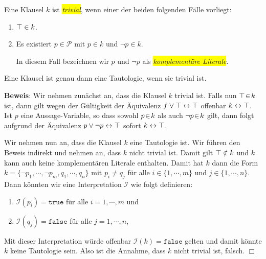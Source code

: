 \begin{Definition}
  Eine Klausel $k$ ist \colorbox{yellow}{\emph{trivial}}, wenn einer der beiden folgenden F\"{a}lle vorliegt:
  \begin{enumerate}
  \item $\top \in k$.
  \item Es existiert $p \in \mathcal{P}$ mit $p \in k$ und $\neg p \in k$.

        In diesem Fall bezeichnen wir $p$ und $\neg p$ als \colorbox{yellow}{\emph{komplement\"{a}re Literale}}.
        \eox
\end{enumerate}
\end{Definition}

\begin{Satz} \label{satz:trivial}
  Eine Klausel ist genau dann eine Tautologie, wenn sie trivial ist.
\end{Satz}
\textbf{Beweis}:  Wir nehmen zun\"{a}chst an, dass die Klausel $k$ trivial ist.
Falls nun $\top \!\in\! k$ ist, dann gilt wegen der G\"{u}ltigkeit der \"{A}quivalenz 
$f \vee \top \leftrightarrow \top$
offenbar $k \leftrightarrow \top$.   Ist $p$ eine Aussage-Variable, so dass
sowohl $p \!\in\! k$ als auch $\neg p \!\in\! k$ gilt, dann folgt aufgrund der \"{A}quivalenz $p \vee
\neg p \leftrightarrow \top$ sofort $k \leftrightarrow \top$.

Wir nehmen nun an, dass die Klausel $k$ eine Tautologie ist.  Wir f\"{u}hren den Beweis
indirekt und nehmen an, dass $k$ nicht trivial ist.  Damit gilt  $\top \notin k$ und
$k$ kann auch keine komplement\"{a}ren Literale enthalten.  Damit hat $k$ dann die Form
\\[0.2cm]
\hspace*{1.3cm} 
$k = \{ \neg p_1, \cdots, \neg p_m, q_1, \cdots, q_n \}$ \quad mit $p_i
\not= q_j$ f\"{u}r alle $i \in \{ 1,\cdots,m\}$ und $j \in \{1, \cdots, n\}$.
\\[0.2cm]
Dann k\"{o}nnten wir eine Interpretation $\mathcal{I}$ wie folgt definieren:
\begin{enumerate}
\item $\mathcal{I}(p_i) = \mathtt{true}$ f\"{u}r alle $i = 1, \cdots, m$ und
\item $\mathcal{I}(q_j) = \mathtt{false}$ f\"{u}r alle $j = 1, \cdots, n$,
\end{enumerate}
Mit dieser Interpretation w\"{u}rde offenbar $\mathcal{I}(k) = \mathtt{false}$ gelten und damit k\"{o}nnte $k$ keine
Tautologie sein.  Also ist die Annahme, dass $k$ nicht trivial ist, falsch.
\hspace*{\fill}  $\Box$

